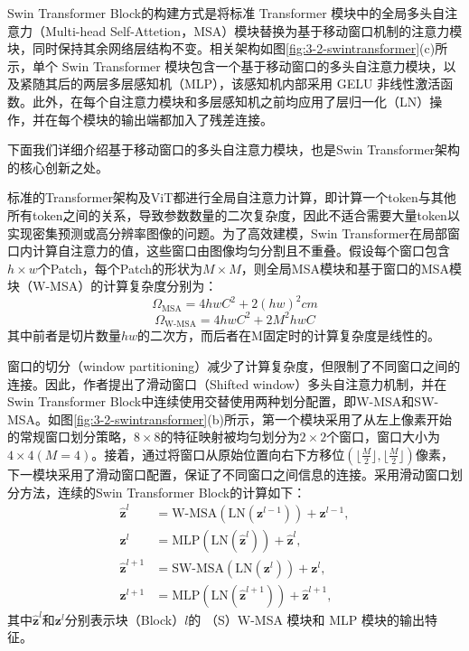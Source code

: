 Swin Transformer Block的构建方式是将标准 Transformer 模块中的全局多头自注意力（Multi-head Self-Attetion，MSA）模块替换为基于移动窗口机制的注意力模块，同时保持其余网络层结构不变。相关架构如图\ref{fig:3-2-swintransformer}(c)所示，单个 Swin Transformer 模块包含一个基于移动窗口的多头自注意力模块，以及紧随其后的两层多层感知机（MLP），该感知机内部采用 GELU 非线性激活函数。此外，在每个自注意力模块和多层感知机之前均应用了层归一化（LN）操作，并在每个模块的输出端都加入了残差连接。

下面我们详细介绍基于移动窗口的多头自注意力模块，也是Swin Transformer架构的核心创新之处。

标准的Transformer架构及ViT\cite{dosovitskiy2020image}都进行全局自注意力计算，即计算一个token与其他所有token之间的关系，导致参数数量的二次复杂度，因此不适合需要大量token以实现密集预测或高分辨率图像的问题。为了高效建模，Swin Transformer在局部窗口内计算自注意力的值，这些窗口由图像均匀分割且不重叠。假设每个窗口包含$h\times w$个Patch，每个Patch的形状为$M\times M$，则全局MSA模块和基于窗口的MSA模块（W-MSA）的计算复杂度分别为：
\begin{equation}
    \Omega_{\text{MSA}} = 4hwC^2 + 2(hw)^2cm
\end{equation}
\begin{equation}
    \Omega_{\text{W-MSA}} = 4hwC^2 + 2M^2hwC
\end{equation}
其中前者是切片数量$hw$的二次方，而后者在M固定时的计算复杂度是线性的。

窗口的切分（window partitioning）减少了计算复杂度，但限制了不同窗口之间的连接。因此，作者提出了滑动窗口（Shifted window）多头自注意力机制，并在Swin Transformer Block中连续使用交替使用两种划分配置，即W-MSA和SW-MSA。如图\ref{fig:3-2-swintransformer}(b)所示，第一个模块采用了从左上像素开始的常规窗口划分策略，$8\times 8$的特征映射被均匀划分为$2\times 2$个窗口，窗口大小为$4\times 4(M = 4)$。接着，通过将窗口从原始位置向右下方移位$(\lfloor \frac{M}{2}\rfloor,\lfloor \frac{M}{2}\rfloor)$像素，下一模块采用了滑动窗口配置，保证了不同窗口之间信息的连接。采用滑动窗口划分方法，连续的Swin Transformer Block的计算如下：
\begin{equation}
\begin{aligned}
\hat{\mathbf{z}}^l &= \text{W-MSA}\left(\text{LN}\left(\mathbf{z}^{l-1}\right)\right) + \mathbf{z}^{l-1}, \\
\mathbf{z}^l &= \text{MLP}\left(\text{LN}\left(\hat{\mathbf{z}}^l\right)\right) + \hat{\mathbf{z}}^l, \\
\hat{\mathbf{z}}^{l+1} &= \text{SW-MSA}\left(\text{LN}\left(\mathbf{z}^l\right)\right) + \mathbf{z}^l, \\
\mathbf{z}^{l+1} &= \text{MLP}\left(\text{LN}\left(\hat{\mathbf{z}}^{l+1}\right)\right) + \hat{\mathbf{z}}^{l+1},
\end{aligned}
\end{equation}
其中$\hat{\mathbf{z}}^l$和$\mathbf{z}^l$分别表示块（Block）$l$的 （S）W-MSA 模块和 MLP 模块的输出特征。

